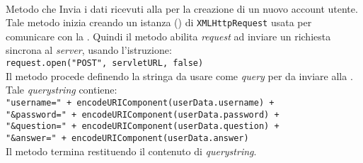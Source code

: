 \begin{description}
	\item{}\\
	Metodo che Invia i dati ricevuti alla  per la creazione di un nuovo account utente. Tale metodo inizia creando un istanza () di \texttt{XMLHttpRequest} usata per comunicare con la . Quindi il metodo abilita \textit{request} ad inviare un richiesta sincrona al \textit{server}, usando l'istruzione:\\
	
	\verb|request.open("POST", servletURL, false)|\\
	
	Il metodo procede definendo la stringa da usare come \textit{query} per da inviare alla . Tale \textit{querystring} contiene:\\
	
	\verb|"username=" + encodeURIComponent(userData.username) +|\\
	\verb|"&password=" + encodeURIComponent(userData.password) +|\\
	\verb|"&question=" + encodeURIComponent(userData.question) +|\\
	\verb|"&answer=" + encodeURIComponent(userData.answer)|\\
	
	Il metodo termina restituendo il contenuto di \textit{querystring}.
	

\end{description}
